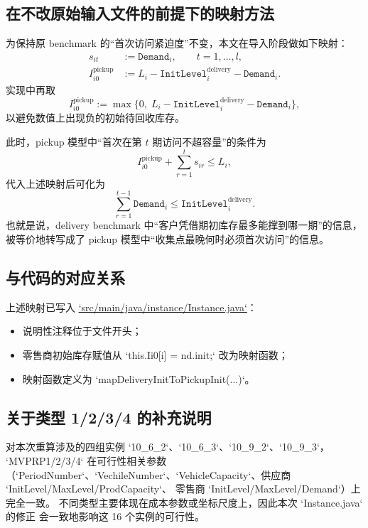 \documentclass{article}
\begin{document}
\subsection{在不改原始输入文件的前提下的映射方法}

为保持原 benchmark 的“首次访问紧迫度”不变，本文在导入阶段做如下映射：
\begin{align}
s_{it} &:= \texttt{Demand}_i, \qquad t=1,\dots,l,\\
I^{\text{pickup}}_{i0} &:= L_i - \texttt{InitLevel}^{\text{delivery}}_i - \texttt{Demand}_i.
\end{align}
实现中再取
\begin{equation}
I^{\text{pickup}}_{i0} := \max\{0,\; L_i - \texttt{InitLevel}^{\text{delivery}}_i - \texttt{Demand}_i\},
\end{equation}
以避免数值上出现负的初始待回收库存。

此时，pickup 模型中“首次在第 $t$ 期访问不超容量”的条件为
\begin{equation}
I^{\text{pickup}}_{i0} + \sum_{r=1}^{t} s_{ir} \le L_i,
\end{equation}
代入上述映射后可化为
\begin{equation}
\sum_{r=1}^{t-1} \texttt{Demand}_i \le \texttt{InitLevel}^{\text{delivery}}_i.
\end{equation}
也就是说，delivery benchmark 中“客户凭借期初库存最多能撑到哪一期”的信息，
被等价地转写成了 pickup 模型中“收集点最晚何时必须首次访问”的信息。

\subsection{与代码的对应关系}

上述映射已写入
\href{/Users/tangshenghao/IdeaProjects/MVPPRP/src/main/java/instance/Instance.java}{`src/main/java/instance/Instance.java`}：
\begin{itemize}
\item 说明性注释位于文件开头；
\item 零售商初始库存赋值从 `this.Ii0[i] = nd.init;` 改为映射函数；
\item 映射函数定义为 `mapDeliveryInitToPickupInit(...)`。
\end{itemize}

\subsection{关于类型 1/2/3/4 的补充说明}

对本次重算涉及的四组实例 `10\_6\_2`、`10\_6\_3`、`10\_9\_2`、`10\_9\_3`，
`MVPRP1/2/3/4` 在可行性相关参数
（`PeriodNumber`、`VechileNumber`、`VehicleCapacity`、供应商 `InitLevel/MaxLevel/ProdCapacity`、
零售商 `InitLevel/MaxLevel/Demand`）上完全一致。
不同类型主要体现在成本参数或坐标尺度上，因此本次 `Instance.java` 的修正
会一致地影响这 16 个实例的可行性。
\end{document}
